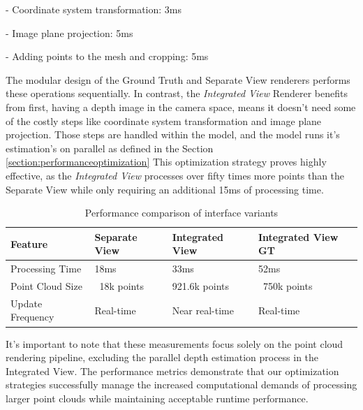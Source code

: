 - Coordinate system transformation: 3ms

- Image plane projection: 5ms

- Adding points to the mesh and cropping: 5ms

The modular design of the Ground Truth and Separate View renderers performs these operations sequentially. In contrast, the \emph{Integrated View} Renderer benefits from first, having a depth image in the camera space, means it doesn't need some of the costly steps like coordinate system transformation and image plane projection. Those steps are handled within the model, and the model runs it's estimation's on parallel as defined in the Section \ref{section:performanceoptimization}
This optimization strategy proves highly effective, as the \emph{Integrated View} processes over fifty times more points than the Separate View while only requiring an additional 15ms of processing time.

\begin{table}[h!]
\centering
\begin{tabular}{|p{3.5cm}|p{3cm}|p{3cm}|p{3cm}|}
\hline
\textbf{Feature} & \textbf{Separate View} & \textbf{Integrated View} & \textbf{Integrated View GT} \\
\hline
Processing Time & 18ms & 33ms & 52ms \\
\hline
Point Cloud Size & ~18k points & 921.6k points & ~750k points \\
\hline
Update Frequency & Real-time & Near real-time & Real-time \\
\hline
\end{tabular}
\caption{Performance comparison of interface variants}
\label{table:interface_comparison}
\end{table}

It's important to note that these measurements focus solely on the point cloud rendering pipeline, excluding the parallel depth estimation process in the Integrated View. The performance metrics demonstrate that our optimization strategies successfully manage the increased computational demands of processing larger point clouds while maintaining acceptable runtime performance.

